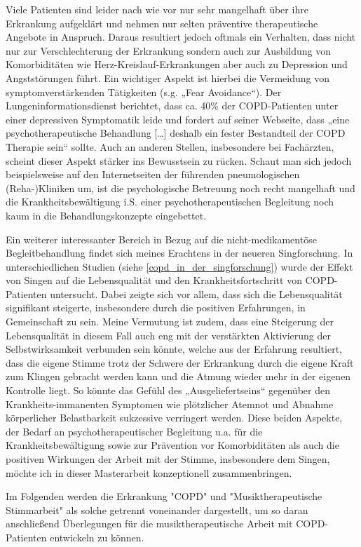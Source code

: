 Viele Patienten sind leider nach wie vor nur sehr mangelhaft über ihre Erkrankung aufgeklärt und nehmen nur selten präventive therapeutische Angebote in Anspruch. Daraus resultiert jedoch oftmals ein Verhalten, dass nicht nur zur Verschlechterung der Erkrankung sondern auch zur Ausbildung von Komorbiditäten wie Herz-Kreislauf-Erkrankungen aber auch zu Depression und Angststörungen führt. Ein wichtiger Aspekt ist hierbei die Vermeidung von symptomverstärkenden Tätigkeiten (s.g. „Fear Avoidance“). Der Lungeninformationsdienst  berichtet, dass ca. 40\% der COPD-Patienten unter einer depressiven Symptomatik leide und fordert auf seiner Webseite, dass „eine psychotherapeutische Behandlung […] deshalb ein fester Bestandteil der COPD Therapie sein“ sollte. Auch an anderen Stellen, insbesondere bei Fachärzten, scheint dieser Aspekt stärker ins Bewusstsein zu rücken. Schaut man sich jedoch beispielsweise auf den Internetseiten der führenden pneumologischen (Reha-)Kliniken um, ist die psychologische Betreuung noch recht mangelhaft und die Krankheitsbewältigung i.S. einer psychotherapeutischen Begleitung noch kaum in die Behandlungskonzepte eingebettet. 

Ein weiterer interessanter Bereich in Bezug auf die nicht-medikamentöse Begleitbehandlung findet sich meines Erachtens in der neueren Singforschung. In unterschiedlichen Studien (siehe \ref{copd_in_der_singforschung}) wurde der Effekt von Singen auf die Lebensqualität und den Krankheitsfortschritt von COPD-Patienten untersucht. Dabei zeigte sich vor allem, dass sich die Lebensqualität signifikant steigerte, insbesondere durch die positiven Erfahrungen, in Gemeinschaft zu sein. Meine Vermutung ist zudem, dass eine Steigerung der Lebensqualität in diesem Fall auch eng mit der verstärkten Aktivierung der Selbstwirksamkeit verbunden sein könnte, welche aus der Erfahrung resultiert, dass die eigene Stimme trotz der Schwere der Erkrankung durch die eigene Kraft zum Klingen gebracht werden kann und die Atmung wieder mehr in der eigenen Kontrolle liegt. So könnte das Gefühl des „Ausgeliefertseins“ gegenüber den Krankheits-immanenten Symptomen wie plötzlicher Atemnot und Abnahme körperlicher Belastbarkeit  sukzessive verringert werden.
Diese beiden Aspekte, der Bedarf an psychotherapeutischer Begleitung u.a. für die Krankheitsbewältigung sowie zur Prävention vor Komorbiditäten als auch die positiven Wirkungen der Arbeit mit der Stimme, insbesondere dem Singen, möchte ich in dieser Masterarbeit konzeptionell zusammenbringen.

Im Folgenden werden die Erkrankung "COPD" und "Musiktherapeutische Stimmarbeit" als solche getrennt voneinander dargestellt, um so daran anschließend Überlegungen für die musiktherapeutische Arbeit mit COPD-Patienten entwickeln zu können.

